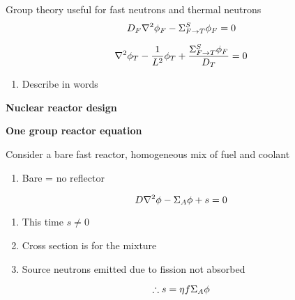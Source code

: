 \documentclass[aspectratio=1610,pdftex,dvipsnames,compress,xcolor={dvipsnames}]{beamer}
\begin{document}
\begin{frame}{Group theory useful for fast neutrons and thermal neutrons}
    \begin{equation}
        \LARGE
        D_F \nabla^2 \phi_F - \Sigma_{F \rightarrow T}^S \phi_F = 0
    \end{equation}

    \begin{equation}
        \LARGE
        \nabla^2 \phi_T - \frac{1}{L^2} \phi_T + \frac{\Sigma_{F \rightarrow T}^S \phi_F}{D_T} = 0
    \end{equation}

    \vspace*{\fill}

    \begin{enumerate}[series=outerlist,topsep=0pt,itemsep=21pt,leftmargin=*,label=(\arabic*)]
        \item[]Describe in words
    \end{enumerate}
\end{frame}


\begin{frame}[plain]{}
    \centering\LARGE\textbf{Nuclear reactor design}
\end{frame}


\begin{frame}[plain]{}
    \centering\LARGE\textbf{One group reactor equation}
\end{frame}


\addtocounter{framenumber}{-2} 
\begin{frame}{Consider a bare fast reactor, homogeneous mix of fuel and coolant}
    \begin{enumerate}[series=outerlist,topsep=0pt,itemsep=21pt,leftmargin=*,label=(\arabic*)]
        \item[]Bare = no reflector
    \end{enumerate}

    \vspace*{\fill}

    \begin{equation}
        \LARGE
        D \nabla^2 \phi - \Sigma_A \phi + s = 0
    \end{equation}

    \vspace*{\fill}

    \begin{enumerate}[series=outerlist,topsep=0pt,itemsep=21pt,leftmargin=*,label=(\arabic*)]
        \item[]This time $s \neq 0$
        \item[]Cross section is for the mixture
        \item[]Source neutrons emitted due to fission not absorbed
    \end{enumerate}

    \vspace*{\fill}

    \begin{equation}
        \LARGE
        \therefore s = \eta f \Sigma_A \phi
    \end{equation}
\end{frame}
\end{document}
